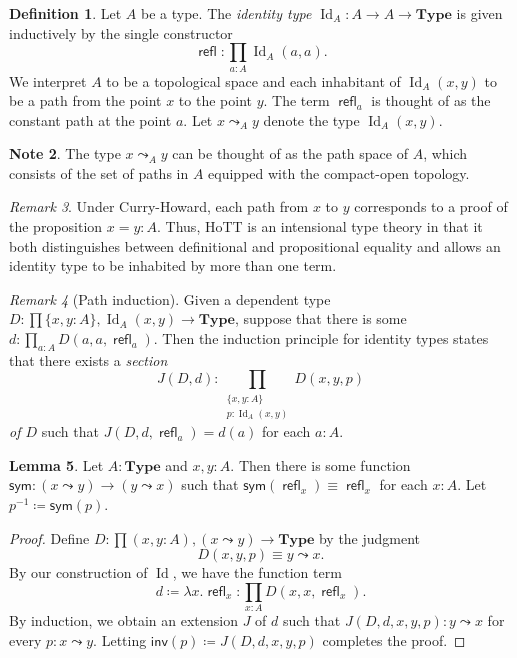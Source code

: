 \documentclass[10pt,letterpaper,cm]{nupset}
\theoremstyle{definition}
\newtheorem{definition}{Definition}[subsection]
\newtheorem{note}[definition]{Note}
\theoremstyle{theorem}
\newtheorem{lemma}[definition]{Lemma}
\theoremstyle{remark}
\newtheorem{remark}[definition]{Remark}
\newcommand{\1}{\mathbf{1}}
\newcommand{\0}{\vec 0}
\DeclareMathOperator{\id}{Id}
\DeclareMathOperator{\refl}{\mathsf{refl}}
\begin{document}
\begin{definition}
Let $A$ be a type. The \textit{identity type $\id_A : A \to A \to \mathbf{Type}$} is given inductively  by the single constructor $$\refl : \prod_{a: A} \id_A(a,a).$$ We interpret $A$ to be a topological space and each inhabitant of $\id_A(x,y)$ to be a path from the point $x$ to the point $y$. The term $\refl_a$ is thought of as the constant path at the point $a$. Let $x \leadsto_A y$ denote the type $\id_A(x,y)$.
\end{definition}

\begin{note}
The type $x \leadsto_A y$ can be thought of as the path space of $A$, which consists of the set of paths in $A$ equipped with the compact-open topology. 
\end{note}

\begin{remark} 
Under Curry-Howard, each path from $x$ to $y$ corresponds to a proof of the proposition  $x=y : A$.  Thus, HoTT is an intensional type theory in that it both distinguishes between definitional and propositional equality and allows an identity type to be inhabited by more than one term.
\end{remark}

\begin{remark}[Path induction]
Given a dependent type $D: \prod {\{x,y:A\}}, \id_A(x,y) \to \mathbf{Type}$, suppose that there is some $d: \prod_{a:A} D(a,a, \refl_a)$. Then the induction principle for identity types states that there exists a \textit{section}  $$J(D, d)  :  \prod_{\substack{\{x,y:A\} \\ p: \id_A(x,y)}} D(x,y,p) $$  \textit{of $D$} such that $J(D, d, \refl_a) = d(a)$ for each $a: A$.
\end{remark}

\begin{lemma}
Let $A: \mathbf{Type}$ and $x,y: A$. Then there is some function $\mathsf{sym}:(x\leadsto y) \to (y \leadsto x)$ such that $\mathsf{sym} (\refl_x) \equiv \refl_x$ for each $x:A$. Let $p^{-1} \coloneqq \mathsf{sym}(p)$.
\end{lemma}
\begin{proof}
Define $D: \prod (x,y:A), (x\leadsto y) \to \mathbf{Type}$ by the judgment $$D(x,y,p) \equiv y \leadsto x .$$ By our construction of $\id$, we have the function term $$d\coloneqq \lambda x. \refl_x : \prod_{x:A}D(x,x,\refl_x).$$ By induction, we obtain an extension $J$ of $d$ such that $J(D, d, x, y, p) : y \leadsto x$ for every $p: x \leadsto y$. Letting $\mathsf{inv}(p) \coloneqq J(D, d,x,y,p)$ completes the proof.
\end{proof}
\end{document}
